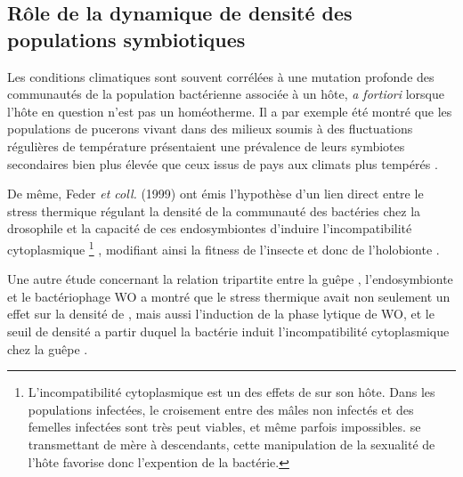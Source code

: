 \subsection{Rôle de la dynamique de densité des populations symbiotiques}

Les conditions climatiques sont souvent corrélées à une mutation profonde des communautés de la population bactérienne associée à un hôte, \textit{a fortiori} lorsque l'hôte en question n'est pas un homéotherme.
Il a par exemple été montré que les populations de pucerons vivant dans des milieux soumis à des fluctuations régulières de température présentaient une prévalence de leurs symbiotes secondaires bien plus élevée que ceux issus de pays aux climats plus tempérés \cite{harmon2009}.

De même, Feder \textit{et coll.} (1999) ont émis l'hypothèse d'un lien direct entre le stress thermique régulant la densité de la communauté des bactéries  chez la drosophile et la capacité de ces endosymbiontes d'induire l'incompatibilité cytoplasmique%
\footnote{L'incompatibilité cytoplasmique est un des effets de  sur son hôte. Dans les populations infectées, le croisement entre des mâles non infectés et des femelles infectées sont très peut viables, et même parfois impossibles.  se transmettant de mère à descendants, cette manipulation de la sexualité de l'hôte favorise donc l'expention de la bactérie.}%
, modifiant ainsi la fitness de l'insecte et donc de l'holobionte \cite{feder1999}. 

Une autre étude concernant la relation tripartite entre la guêpe , l'endosymbionte  et le bactériophage WO a montré que le stress thermique avait non seulement un effet sur la densité de , mais aussi l'induction de la phase lytique de WO, et le seuil de densité a partir duquel la bactérie  induit l'incompatibilité cytoplasmique chez la guêpe \cite{bordenstein2011}.
